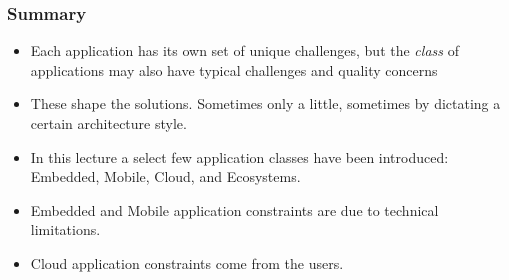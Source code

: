 \documentclass[10pt]{beamer}
\begin{document}
\begin{frame}[t]
\frametitle{Summary}
\begin{itemize}
\item Each application has its own set of unique challenges, but the \emph{class} of applications may also have typical challenges and quality concerns
\item These shape the solutions. Sometimes only a little, sometimes by dictating a certain architecture style.
\item In this lecture a select few application classes have been introduced: Embedded, Mobile, Cloud, and Ecosystems.
\item Embedded and Mobile application constraints are due to technical limitations.
\item Cloud application constraints come from the users.
\end{itemize}
\end{frame}



%    
%    

%     

\end{document}
